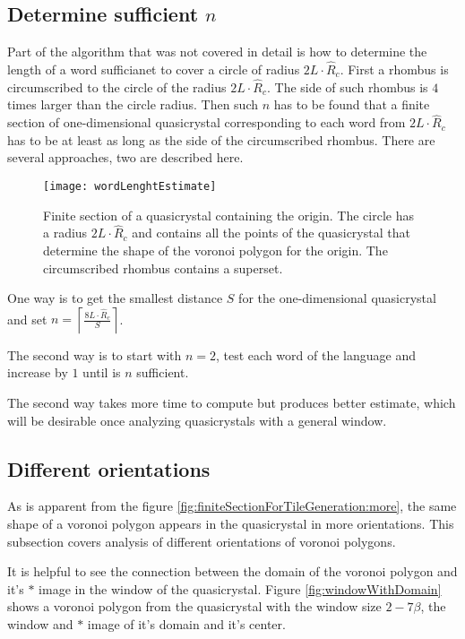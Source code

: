 \documentclass[text.tex]{subfiles}
\begin{document}
\subsection{Determine sufficient $n$}
Part of the algorithm that was not covered in detail is how to determine the length of a word sufficianet to cover a circle of radius $2L\cdot\hat{R}_c$. First a rhombus is circumscribed to the circle of the radius $2L\cdot\hat{R}_c$. The side of such rhombus is $4$ times larger than the circle radius. Then such $n$ has to be found that a finite section of one-dimensional quasicrystal corresponding to each word from $2L\cdot\hat{R}_c$ has to be at least as long as the side of the circumscribed rhombus. 
There are several approaches, two are described here. 

\begin{figure}[h]
\centering
\texttt{[image: wordLenghtEstimate]}
\caption{Finite section of a quasicrystal containing the origin. The circle has a radius $2L\cdot\hat{R}_c$ and contains all the points of the quasicrystal that determine the shape of the voronoi polygon for the origin. The circumscribed rhombus contains a superset.}
\label{fig:wordLenghtEstimate}
\end{figure}

One way is to get the smallest distance $S$ for the one-dimensional quasicrystal and set $n = \left\lceil\frac{8L\cdot\hat{R}_c}{S}\right\rceil$. 

The second way is to start with $n=2$, test each word of the language and increase by $1$ until is $n$ sufficient. 

The second way takes more time to compute but produces better estimate, which will be desirable once analyzing quasicrystals with a general window.

\subsection{Different orientations}
As is apparent from the figure \ref{fig:finiteSectionForTileGeneration:more}, the same shape of a voronoi polygon appears in the quasicrystal in more orientations. This subsection covers analysis of different orientations of voronoi polygons. 

It is helpful to see the connection between the domain of the voronoi polygon and it's $\ast$ image in the window of the quasicrystal. Figure \ref{fig:windowWithDomain} shows a voronoi polygon from the quasicrystal with the window size $2-7\beta$, the window and $\ast$ image of it's domain and it's center. 
\end{document}

